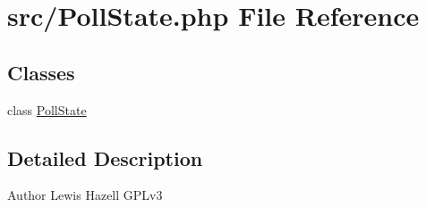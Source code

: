 \hypertarget{PollState_8php}{\section{src/\-Poll\-State.php File Reference}
\label{PollState_8php}
}
\subsection*{Classes}
\begin{DoxyCompactItemize}
\item 
class \hyperlink{classPollState}{Poll\-State}
\end{DoxyCompactItemize}


\subsection{Detailed Description}
\begin{DoxyAuthor}{Author}
Lewis Hazell  G\-P\-Lv3 
\end{DoxyAuthor}
